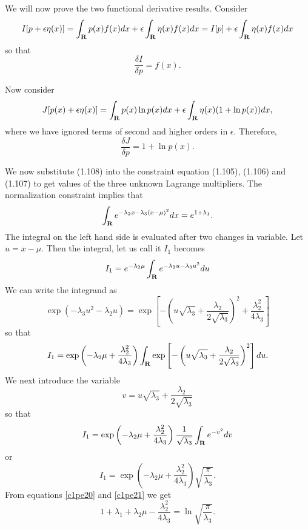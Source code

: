 \begin{enumerate}
We will now prove the two functional derivative results. Consider 
\[
I[p + \epsilon\eta(x)] = \int_{\mathbf{R}} p(x)f(x)dx + \epsilon\int_{\mathbf{R}} \eta(x)f(x)dx = I[p] + \epsilon\int_{\mathbf{R}}\eta(x)f(x)dx
\]
so that
\[
\frac{\delta I}{\delta p} = f(x).
\]

Now consider
\[
J[p(x) + \epsilon\eta(x)] = \int_{\mathbf{R}} p(x)\ln p(x)dx + \epsilon\int_{\mathbf{R}}\eta(x)(1 + \ln p(x))dx,
\]
where we have ignored terms of second and higher orders in $\epsilon$. Therefore,
\[
\frac{\delta J}{\delta p} = 1 + \ln p(x).
\]

We now substitute (1.108) into the constraint equation (1.105), (1.106) and (1.107) to get
values of the three unknown Lagrange multipliers. The normalization constraint implies that
\begin{equation}\label{c1pe20}
\int_{\mathbf{R}} e^{-\lambda_2 x - \lambda_3(x - \mu)^2}dx = e^{1 + \lambda_1}.
\end{equation}
The integral on the left hand side is evaluated after two changes in variable. Let $u = x - \mu$.
Then the integral, let us call it $I_1$ becomes
\[
I_1 = e^{-\lambda_2\mu}\int_{\mathbf{R}} e^{-\lambda_2 u - \lambda_3 u^2}du
\]
We can write the integrand as
\[
\exp\left(-\lambda_3 u^2 - \lambda_2 u\right) = \exp\left[-\left(u\sqrt{\lambda_3} + \frac{\lambda_2}{2\sqrt{\lambda_3}}\right)^2 + \frac{\lambda_2^2}{4\lambda_3}\right]
\]
so that
\[
I_1 = \exp\left(-\lambda_2\mu + \frac{\lambda_2^2}{4\lambda_3}\right)\int_{\mathbf{R}}\exp\left[-\left(u\sqrt{\lambda_3} + \frac{\lambda_2}{2\sqrt{\lambda_3}}\right)^2\right]du.
\]
We next introduce the variable
\[
v = u\sqrt{\lambda_3} + \frac{\lambda_2}{2\sqrt{\lambda_3}}
\]
so that
\[
I_1 = \exp\left(-\lambda_2\mu + \frac{\lambda_2^2}{4\lambda_3}\right)\frac{1}{\sqrt{\lambda_3}}\int_{\mathbf{R}} e^{-v^2}dv
\]
or
\begin{equation}\label{c1pe21}
I_1 = \exp\left(-\lambda_2\mu + \frac{\lambda_2^2}{4\lambda_3}\right)\sqrt{\frac{\pi}{\lambda_3}}.
\end{equation}
From equations \eqref{c1pe20} and \eqref{c1pe21} we get
\begin{equation}\label{c1pe22}
1 + \lambda_1 + \lambda_2\mu - \frac{\lambda_2^2}{4\lambda_3} = \ln\sqrt{\frac{\pi}{\lambda_3}}.
\end{equation}


\end{enumerate}
